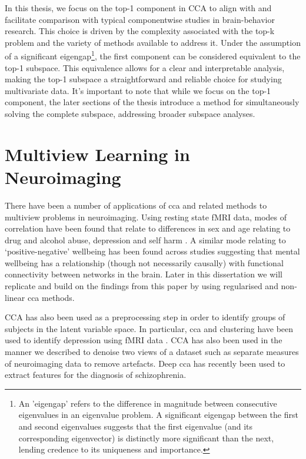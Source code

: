 In this thesis, we focus on the top-1 component in CCA to align with and facilitate comparison with typical componentwise studies in brain-behavior research. This choice is driven by the complexity associated with the top-k problem and the variety of methods available to address it. Under the assumption of a significant eigengap\footnote{An 'eigengap' refers to the difference in magnitude between consecutive eigenvalues in an eigenvalue problem. A significant eigengap between the first and second eigenvalues suggests that the first eigenvalue (and its corresponding eigenvector) is distinctly more significant than the next, lending credence to its uniqueness and importance.}, the first component can be considered equivalent to the top-1 subspace. This equivalence allows for a clear and interpretable analysis, making the top-1 subspace a straightforward and reliable choice for studying multivariate data. It's important to note that while we focus on the top-1 component, the later sections of the thesis introduce a method for simultaneously solving the complete subspace, addressing broader subspace analyses.

\section{Multiview Learning in Neuroimaging}

There have been a number of applications of \acrshort{cca} and related methods to multiview problems in neuroimaging.
Using resting state fMRI data, modes of correlation have been found that relate to differences in sex and age relating to drug and alcohol abuse, depression and self harm \citep{mihalik2019brain}.
A similar mode relating to `positive-negative' wellbeing has been found across studies \citep{smith2015positive}suggesting that mental wellbeing has a relationship (though not necessarily causally) with functional connectivity between networks in the brain.
Later in this dissertation we will replicate and build on the findings from this paper by using regularised and non-linear \acrshort{cca} methods.

CCA has also been used as a preprocessing step in order to identify groups of subjects in the latent variable space.
In particular, \acrshort{cca} and clustering have been used to identify depression using fMRI data\citep{dinga2019evaluating} \citep{drysdale2017resting}.
CCA has also been used in the manner we described to denoise two \gls{views} of a dataset such as separate measures of neuroimaging data \citep{zhuang2020technical} to remove artefacts.
Deep \acrshort{cca} has recently been used to extract features for the diagnosis of schizophrenia\citep{qi2016deep}.


